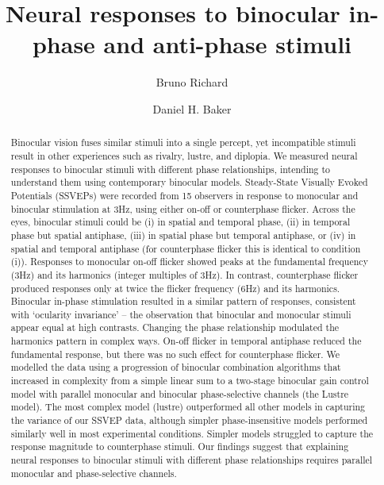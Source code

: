\documentclass[
  12pt,
]{article}
\title{Neural responses to binocular in-phase and anti-phase stimuli}
\author[1]{Bruno Richard}
\author[2]{Daniel H. Baker}
\affil[1]{Department of Math and Computer Sciences, Rutgers
University, Newark, New Jersey, USA}
\affil[2]{Department of Psychology, University of York, York, UK}
\date{}
\begin{document}
\maketitle
\begin{abstract}
Binocular vision fuses similar stimuli into a single percept, yet
incompatible stimuli result in other experiences such as rivalry,
lustre, and diplopia. We measured neural responses to binocular stimuli
with different phase relationships, intending to understand them using
contemporary binocular models. Steady-State Visually Evoked Potentials
(SSVEPs) were recorded from 15 observers in response to monocular and
binocular stimulation at 3Hz, using either on-off or counterphase
flicker. Across the eyes, binocular stimuli could be (i) in spatial and
temporal phase, (ii) in temporal phase but spatial antiphase, (iii) in
spatial phase but temporal antiphase, or (iv) in spatial and temporal
antiphase (for counterphase flicker this is identical to condition (i)).
Responses to monocular on-off flicker showed peaks at the fundamental
frequency (3Hz) and its harmonics (integer multiples of 3Hz). In
contrast, counterphase flicker produced responses only at twice the
flicker frequency (6Hz) and its harmonics. Binocular in-phase
stimulation resulted in a similar pattern of responses, consistent with
`ocularity invariance' -- the observation that binocular and monocular
stimuli appear equal at high contrasts. Changing the phase relationship
modulated the harmonics pattern in complex ways. On-off flicker in
temporal antiphase reduced the fundamental response, but there was no
such effect for counterphase flicker. We modelled the data using a
progression of binocular combination algorithms that increased in
complexity from a simple linear sum to a two-stage binocular gain
control model with parallel monocular and binocular phase-selective
channels (the Lustre model). The most complex model (lustre)
outperformed all other models in capturing the variance of our SSVEP
data, although simpler phase-insensitive models performed similarly well
in most experimental conditions. Simpler models struggled to capture the
response magnitude to counterphase stimuli. Our findings suggest that
explaining neural responses to binocular stimuli with different phase
relationships requires parallel monocular and phase-selective channels.
\end{abstract}
\end{document}
